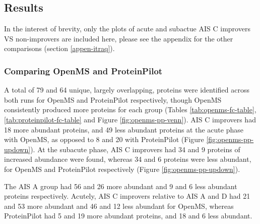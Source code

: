 \documentclass[9pt,lineno]{elife}
\begin{document}
\hypertarget{chap-3-results}{%
\subsection{Results}\label{chap-3-results}}

In the interest of brevity, only the plots of acute and subactue AIS C improvers VS non-improvers are included here, please see the appendix for the other comparisons (section \ref{appen-itraq}).

\hypertarget{comparing-openms-and-proteinpilot}{%
\subsubsection{Comparing OpenMS and ProteinPilot}\label{comparing-openms-and-proteinpilot}}

A total of 79 and 64 unique, largely overlapping, proteins were identified across both runs for OpenMS and ProteinPilot respectively, though OpenMS consistently produced more proteins for each group (Tables \ref{tab:openms-fc-table}, \ref{tab:proteinpilot-fc-table} and Figure \ref{fig:openms-pp-venn}).
AIS C improvers had 18 more abundant proteins, and 49 less abundant proteins at the acute phase with OpenMS, as opposed to 8 and 20 with ProteinPilot (Figure \ref{fig:openms-pp-updown}).
At the subacute phase, AIS C improvers had 34 and 9 proteins of increased abundance were found, whereas 34 and 6 proteins were less abundant, for OpenMS and ProteinPilot respectively (Figure \ref{fig:openms-pp-updown}).

The AIS A group had 56 and 26 more abundant and 9 and 6 less abundant proteins respectively.
Acutely, AIS C improvers relative to AIS A and D had 21 and 53 more abundant and 46 and 12 less abundant for OpenMS, whereas ProteinPilot had 5 and 19 more abundant proteins, and 18 and 6 less abundant.

\clearpage
\end{document}
